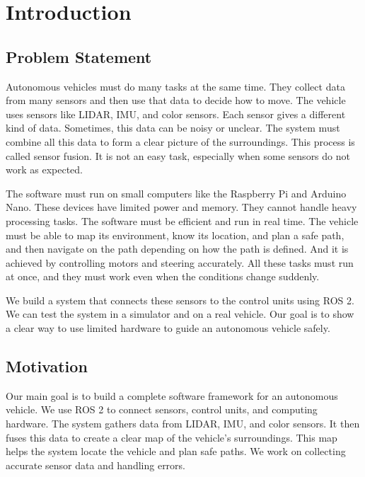 \documentclass[english,project]{buwthesis}
\begin{document}
\chapter{Introduction} \label{introduction}

\section{Problem Statement}

Autonomous vehicles must do many tasks at the same time. They collect data from many sensors and then use that data to decide how to move. The vehicle uses sensors like LIDAR, IMU, and color sensors. Each sensor gives a different kind of data. Sometimes, this data can be noisy or unclear. The system must combine all this data to form a clear picture of the surroundings. This process is called sensor fusion. It is not an easy task, especially when some sensors do not work as expected.

The software must run on small computers like the Raspberry Pi and Arduino Nano. These devices have limited power and memory. They cannot handle heavy processing tasks. The software must be efficient and run in real time. The vehicle must be able to map its environment, know its location, and plan a safe path, and then navigate on the path depending on how the path is defined. And it is achieved by controlling motors and steering accurately. All these tasks must run at once, and they must work even when the conditions change suddenly. 

We build a system that connects these sensors to the control units using ROS 2. We can test the system in a simulator and on a real vehicle. Our goal is to show a clear way to use limited hardware to guide an autonomous vehicle safely.

\section{Motivation}

Our main goal is to build a complete software framework for an autonomous vehicle. We use ROS 2 to connect sensors, control units, and computing hardware. The system gathers data from LIDAR, IMU, and color sensors. It then fuses this data to create a clear map of the vehicle's surroundings. This map helps the system locate the vehicle and plan safe paths. We work on collecting accurate sensor data and handling errors.
\end{document}
